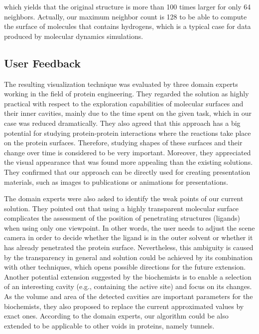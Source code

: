 which yields that the original structure is more than 100 times larger for only 64 neighbors.
Actually, our maximum neighbor count is 128 to be able to compute the surface of molecules that contains hydrogens, which is a typical case for data produced by molecular dynamics simulations.


\subsection{User Feedback}
The resulting visualization technique was evaluated by three domain experts working in the field of protein engineering. They regarded the solution as highly practical with respect to the exploration capabilities of molecular surfaces and their inner cavities, mainly due to the time spent on the given task, which in our case was reduced dramatically.
They also agreed that this approach has a big potential for studying protein-protein interactions where the reactions take place on the protein surfaces.
Therefore, studying shapes of these surfaces and their change over time is considered to be very important.
Moreover, they appreciated the visual appearance that was found more appealing than the existing solutions.
They confirmed that our approach can be directly used for creating presentation materials, such as images to publications or animations for presentations.

The domain experts were also asked to identify the weak points of our current solution.
They pointed out that using a highly transparent molecular surface complicates the assessment of the position of penetrating structures (ligands) when using only one viewpoint.
In other words, the user needs to adjust the scene camera in order to decide whether the ligand is in the outer solvent or whether it has already penetrated the protein surface.
Nevertheless, this ambiguity is caused by the transparency in general and solution could be achieved by its combination with other techniques, which opens possible directions for the future extension.
Another potential extension suggested by the biochemists is to enable a selection of an interesting cavity (e.g., containing the active site) and focus on its changes.
As the volume and area of the detected cavities are important parameters for the biochemists, they also proposed to replace the current approximated values by exact ones.
According to the domain experts, our algorithm could be also extended to be applicable to other voids in proteins, namely tunnels.


